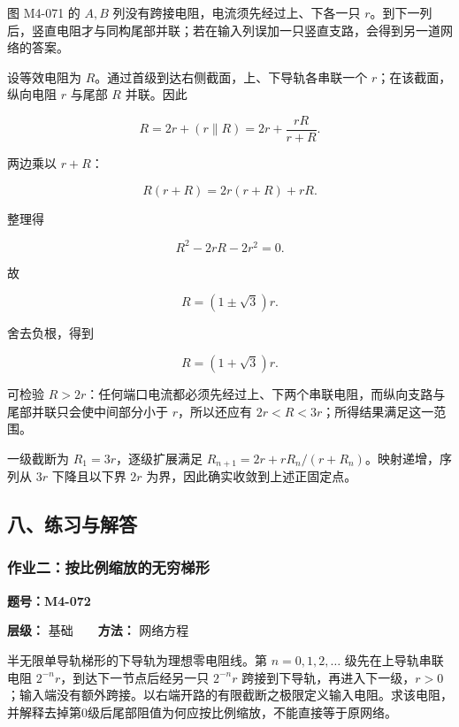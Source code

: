 图 M4-071 的 \(A,B\) 列没有跨接电阻，电流须先经过上、下各一只
\(r\)。到下一列后，竖直电阻才与同构尾部并联；若在输入列误加一只竖直支路，会得到另一道网络的答案。

设等效电阻为 \(R\)。通过首级到达右侧截面，上、下导轨各串联一个
\(r\)；在该截面，纵向电阻 \(r\) 与尾部 \(R\) 并联。因此

\[
R=2r+\left(r\parallel R\right)
=2r+\frac{rR}{r+R}.
\]

两边乘以 \(r+R\)：

\[
R(r+R)=2r(r+R)+rR.
\]

整理得

\[
R^2-2rR-2r^2=0.
\]

故

\[
R=(1\pm\sqrt3)r.
\]

舍去负根，得到

\[
\boxed{R=(1+\sqrt3)r}.
\]

可检验
\(R>2r\)：任何端口电流都必须先经过上、下两个串联电阻，而纵向支路与尾部并联只会使中间部分小于
\(r\)，所以还应有 \(2r<R<3r\)；所得结果满足这一范围。

一级截断为 \(R_1=3r\)，逐级扩展满足
\(R_{n+1}=2r+rR_n/(r+R_n)\)。映射递增，序列从 \(3r\) 下降且以下界 \(2r\)
为界，因此确实收敛到上述正固定点。

\subsection{八、练习与解答}\label{m4:ux516bux7ec3ux4e60ux4e0eux89e3ux7b54-3}

\par{}
\noindent\begin{minipage}{\linewidth}

\subsubsection{作业二：按比例缩放的无穷梯形}\label{m4:ux4f5cux4e1aux4e8cux6309ux6bd4ux4f8bux7f29ux653eux7684ux65e0ux7a77ux68afux5f62}

\textbf{题号：M4-072}

\textbf{层级：} 基础　　\textbf{方法：} 网络方程

半无限单导轨梯形的下导轨为理想零电阻线。第 \(n=0,1,2,\ldots\)
级先在上导轨串联电阻 \(2^{-n}r\)，到达下一节点后经另一只 \(2^{-n}r\)
跨接到下导轨，再进入下一级，\(r>0\)；输入端没有额外跨接。以右端开路的有限截断之极限定义输入电阻。求该电阻，并解释去掉第0级后尾部阻值为何应按比例缩放，不能直接等于原网络。

\end{minipage}\par

